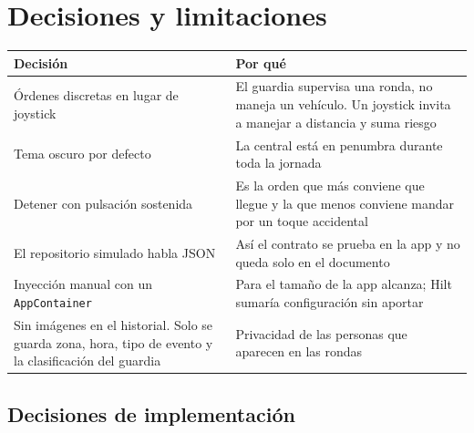 \section{Decisiones y limitaciones}
\label{sec:decisiones}

\begin{table}[H]
\centering\small
\begin{tabularx}{\textwidth}{@{}L L@{}}
\toprule
\textbf{Decisión} & \textbf{Por qué} \\
\midrule
Órdenes discretas en lugar de joystick & El guardia supervisa una ronda, no maneja un vehículo. Un joystick invita a manejar a distancia y suma riesgo \\
Tema oscuro por defecto & La central está en penumbra durante toda la jornada \\
Detener con pulsación sostenida & Es la orden que más conviene que llegue y la que menos conviene mandar por un toque accidental \\
El repositorio simulado habla JSON & Así el contrato se prueba en la app y no queda solo en el documento \\
Inyección manual con un \texttt{AppContainer} & Para el tamaño de la app alcanza; Hilt sumaría configuración sin aportar \\
Sin imágenes en el historial. Solo se guarda zona, hora, tipo de evento y la clasificación del guardia & Privacidad de las personas que aparecen en las rondas \\
\bottomrule
\end{tabularx}
\end{table}

\subsection{Decisiones de implementación}

